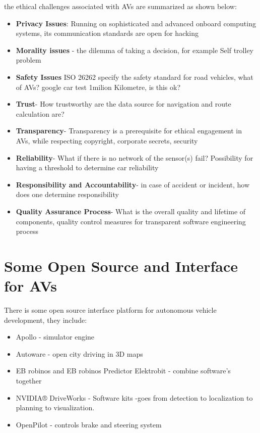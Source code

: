 \documentclass{book}
\newcommand{\jk}[1]{\todo[inline]{JK: #1}}
\begin{document}
the ethical challenges associated with AVs are summarized as shown below:
\begin{itemize}
  \item \textbf{Privacy Issues}: Running on sophisticated and advanced onboard computing systems, its communication standards are open for hacking \cite{amoozadeh2015security, collingwood2017privacy}
  \item \textbf{Morality issues} - the dilemma of taking a decision, for example Self trolley problem \cite{nyholm2016ethics, di2013self}
  \item \textbf{Safety Issues} ISO 26262 specify the
safety standard for road vehicles, what of AVs? google car test 1milion Kilometre, is this ok? \cite{koopman2017autonomous, kafka2012automotive,koopman2016challenges, birch2013safety}
  \item \textbf{Trust}- How trustworthy are the data source for navigation and route calculation are? \cite{yan2016can}
  \item \textbf{Transparency}- Transparency is a prerequisite for ethical engagement in AVs, while respecting copyright, corporate secrets, security
  \item \textbf{ Reliability}- What if there is no network of the sensor(s) fail? Possibility for having a threshold to determine car reliability
  \item \textbf{ Responsibility and Accountability}- in case of accident or incident, how does one determine responsibility \cite{lin2019autonomous,abduljabbar2019applications}
  \item \textbf{ Quality Assurance Process}- What is the overall quality and lifetime of components, quality control measures for transparent software engineering process
  \end{itemize}

\section {Some Open Source and Interface for AVs}

\jk{This geos to related work / background}

There is some open source interface platform for autonomous vehicle development, they include:
\begin{itemize}
\item Apollo - simulator engine
\item Autoware - open city driving in 3D maps
\item EB robinos and EB robinos Predictor  Elektrobit - combine software's together
\item NVIDIA® DriveWorks - Software kits -goes from detection to localization to planning to visualization.
\item OpenPilot - controls brake and steering system
\end{itemize}
\end{document}
